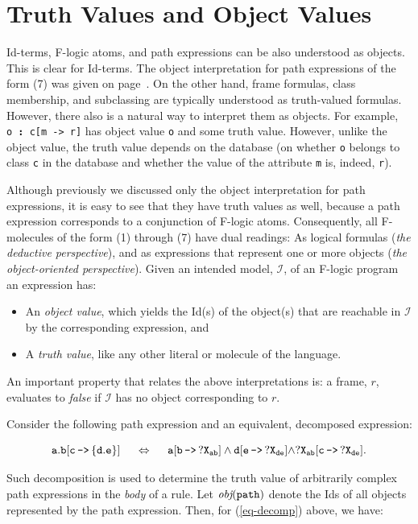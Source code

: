 \documentclass[11pt]{article}
\newcommand{\obj}{\textit{obj}\xspace}
\newcommand{\db}[1]{\ensuremath{\mathcal{#1}}}
\newcommand{\isa}{\,{\bf{:}}\,}
\newcommand{\mvd}{{\mbox{\tt \,->\,}}}  %
\newcommand{\fl}{\mbox{F-logic}\xspace}
\begin{document}
\section{Truth Values and Object Values}
\label{sec-references}


Id-terms, \fl atoms, and path expressions can be also understood as
objects. This is clear for Id-terms. The object interpretation for path
expressions of the form (7) was given on page~\pageref{eq-path-fun}.
On the other hand, frame formulas, class membership, and subclassing
are typically understood as truth-valued formulas.
However, there
also is a natural way to interpret them as objects.  For example,
{\tt o{\isa}c[m{\mvd}r]} has object value {\tt o} and some truth value.
However, unlike the object value, the truth value depends on the database
(on whether {\tt o} belongs to class {\tt c} in the database and whether
the value of the attribute {\tt m} is, indeed, {\tt r}).

Although previously we discussed only the object interpretation for path
expressions, it is easy to see that they have truth values as well, because
a path expression corresponds to a conjunction of F-logic atoms.
Consequently, all F-molecules of the form (1) through (7) have dual
readings: As logical formulas (\emph{the deductive perspective}), and as
expressions that represent one or more objects (\emph{the object-oriented
  perspective}).  Given an intended model, \db I, of an \fl program an
expression has:
\begin{itemize}
\item An \emph{object value}, which yields the Id(s) of the object(s)
  that are reachable in \db I by the corresponding expression, and 
\item A \emph{truth value}, like any other literal or molecule of the
  language. 
\end{itemize}
An important property that relates the above interpretations is: a
frame, $r$, evaluates to \emph{false} if \db I has no object
corresponding to $r$.


Consider the following path expression and an equivalent, decomposed
expression:

\begin{equation}\label{eq-decomp}
\tt
a.b[c\mvd\{d.e\}] \quad\ \Leftrightarrow \quad\  a[b\mvd ?X_{ab}]
\land d[e\mvd ?X_{de}] \land ?X_{ab}[c\mvd ?X_{de}]. 
\end{equation}

\noindent
Such decomposition is used to determine the truth value of arbitrarily complex
path expressions in the \emph{body} of a rule.  Let $\tt \obj(path)$ denote
the Ids of all objects represented by the path expression. Then, for
(\ref{eq-decomp}) above, we have:
\end{document}
